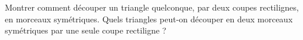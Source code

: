 Montrer comment découper un triangle quelconque, par deux coupes rectilignes, en morceaux symétriques. Quels triangles peut-on découper en deux morceaux symétriques par une seule coupe rectiligne ?
